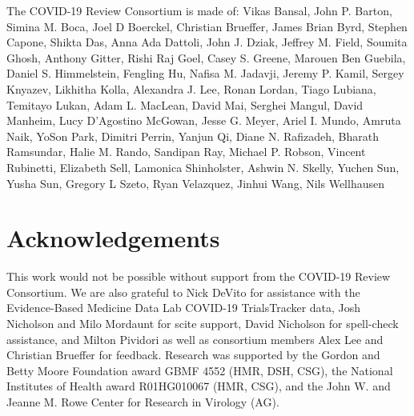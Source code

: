 \documentclass[twocolumn]{ceurart}
\begin{document}
The COVID-19 Review Consortium is made of:
Vikas Bansal, John P. Barton, Simina M. Boca, Joel D Boerckel, Christian Brueffer, James Brian Byrd, Stephen Capone, Shikta Das, Anna Ada Dattoli, John J. Dziak, Jeffrey M. Field, Soumita Ghosh, Anthony Gitter, Rishi Raj Goel, Casey S. Greene, Marouen Ben Guebila, Daniel S. Himmelstein, Fengling Hu, Nafisa M. Jadavji, Jeremy P. Kamil, Sergey Knyazev, Likhitha Kolla, Alexandra J. Lee, Ronan Lordan, Tiago Lubiana, Temitayo Lukan, Adam L. MacLean, David Mai, Serghei Mangul, David Manheim, Lucy D'Agostino McGowan, Jesse G. Meyer, Ariel I. Mundo, Amruta Naik, YoSon Park, Dimitri Perrin, Yanjun Qi, Diane N. Rafizadeh, Bharath Ramsundar, Halie M. Rando, Sandipan Ray, Michael P. Robson, Vincent Rubinetti, Elizabeth Sell, Lamonica Shinholster, Ashwin N. Skelly, Yuchen Sun, Yusha Sun, Gregory L Szeto, Ryan Velazquez, Jinhui Wang, Nils Wellhausen

\hypertarget{acknowledgements}{%
\section*{Acknowledgements}\label{acknowledgements}}

This work would not be possible without support from the COVID-19 Review Consortium.
We are also grateful to Nick DeVito for assistance with the Evidence-Based Medicine Data Lab COVID-19 TrialsTracker data, Josh Nicholson and Milo Mordaunt for scite support, David Nicholson for spell-check assistance, and Milton Pividori as well as consortium members Alex Lee and Christian Brueffer for feedback.
Research was supported by the Gordon and Betty Moore Foundation award GBMF 4552 (HMR, DSH, CSG), the National Institutes of Health award R01HG010067 (HMR, CSG), and the John W. and Jeanne M. Rowe Center for Research in Virology (AG).



\end{document}
